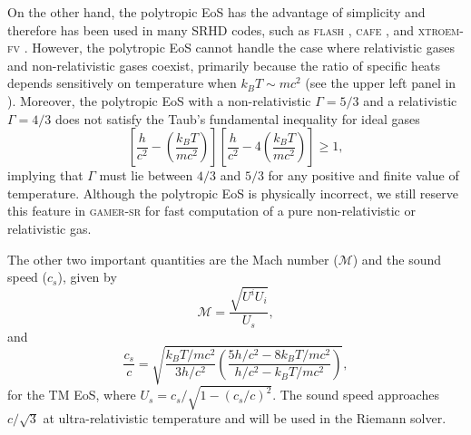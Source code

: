 On the other hand, the polytropic EoS has the advantage of simplicity and therefore has been used in many SRHD codes, such as \textsc{flash} \citep{FLASH}, \textsc{cafe} \citep{CAFE}, and \textsc{xtroem-fv} \citep{XTROEM}. However, the polytropic EoS cannot handle the case where relativistic gases  and non-relativistic gases coexist, primarily because the ratio of specific heats depends sensitively on temperature when $k_{B}T \sim mc^2$ (see the upper left panel in ). Moreover, the polytropic EoS with a non-relativistic $\Gamma=5/3$ and a relativistic $\Gamma=4/3$ does not satisfy the Taub's fundamental inequality for ideal gases \citep{Taub}
\begin{equation}
    \left[\frac{h}{c^2}-\left(\frac{k_B T}{mc^2}\right)\right]
    \left[\frac{h}{c^2}-4\left(\frac{k_B T}{mc^2}\right)\right]
    \geq 1,
\end{equation}
implying that $\Gamma$ must lie between $4/3$ and $5/3$ for any positive and finite value of temperature. Although the polytropic EoS is physically incorrect, we still reserve this feature in \textsc{gamer-sr} for fast computation of a pure non-relativistic or relativistic gas.

The other two important quantities are the Mach number ($\mathscr{M}$) and the sound speed ($c_{s}$), given by
\begin{equation}
    \mathscr{M}=\frac{\sqrt{U^iU_i}}{U_{s}},
    \label{eq:MachNumber}
\end{equation}
and
\begin{equation}
\frac{c_{s}}{c} = \sqrt{\frac{k_{B}T/mc^{2}}{3h/c^2}\left(\frac{5h/c^2-8k_{B}T/mc^{2}}{h/c^2-k_{B}T/mc^{2}}\right)},
\label{sound_speed}
\end{equation}
for the TM EoS, where $U_{s}=c_{s}/\sqrt{1-\left(c_{s}/c\right)^2}$. The sound speed approaches $c/\sqrt{3}$ at ultra-relativistic temperature and will be used in the Riemann solver.


